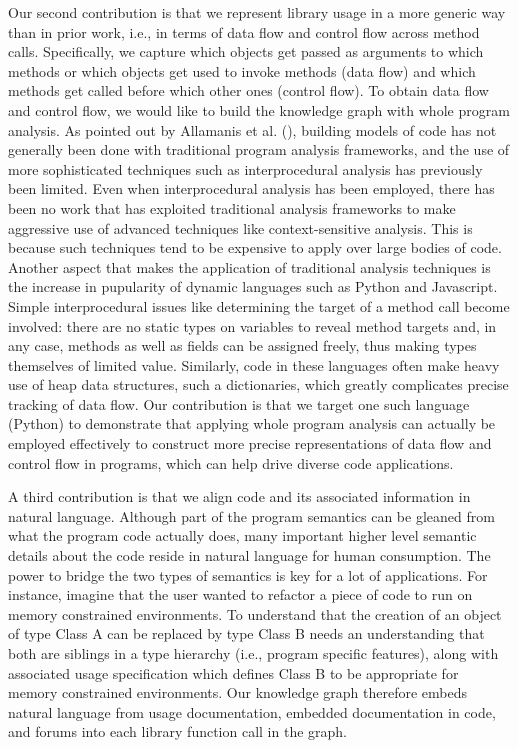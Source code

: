 Our second contribution is that we represent library usage in a more generic way than in prior work, i.e., in terms of data flow and control flow across method calls.  Specifically, we capture which objects get passed as arguments to which methods or which objects get used to invoke methods (data flow) and which methods get called before which other ones (control flow).  To obtain data flow and control flow, we would like to build the knowledge graph with whole program analysis.  As pointed out by Allamanis et al. (\cite{Allamanis:2018:SML:3236632.3212695}), building models of code has not generally been done with traditional program analysis frameworks, and the use of more sophisticated techniques such as interprocedural analysis has previously been limited.  Even when interprocedural analysis has been employed, there has been no work that has exploited traditional analysis frameworks to make aggressive use of advanced techniques like context-sensitive analysis.  This is because such techniques tend to be expensive to apply over large bodies of code.  
Another aspect that makes the application of traditional analysis techniques is the increase in pupularity of dynamic languages such as Python and Javascript.  Simple interprocedural issues like determining the target of a method call become involved: there are no static types on variables to reveal method targets and, in any case, methods as well as fields can be assigned freely, thus making types themselves of limited value.  Similarly, code in these languages often make heavy use of heap data structures, such a dictionaries, which greatly complicates precise tracking of data flow.  Our contribution is that we target one such language (Python) to demonstrate that applying whole program analysis can actually be employed effectively to construct more precise representations of data flow and control flow in programs, which can help drive diverse code applications.

A third contribution is that we align code and its associated information in natural language.  Although part of the program semantics can be gleaned from what the program code actually does, many important higher level semantic details about the code reside in natural language for human consumption.  The power to bridge the two types of semantics is key for a lot of applications.  For instance, imagine that the user wanted to refactor a piece of code to run on memory constrained environments.  To understand that the creation of an object of type Class A can be replaced by type Class B needs an understanding that both are siblings in a type hierarchy (i.e., program specific features), along with associated usage specification which defines Class B to be appropriate for memory constrained environments.  Our knowledge graph therefore embeds natural language from usage documentation, embedded documentation in code, and forums into each library function call in the graph.



